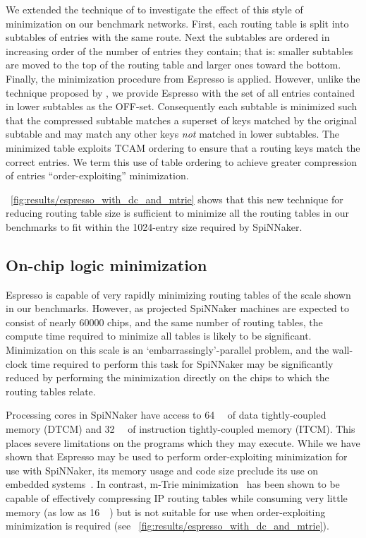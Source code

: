 \documentclass[conference]{IEEEtran}
\begin{document}
We extended the technique of \textcite{Liu2002} to investigate the effect of this style of minimization on our benchmark networks.
First, each routing table is split into subtables of entries with the same route.
Next the subtables are ordered in increasing order of the number of entries they contain; that is: smaller subtables are moved to the top of the routing table and larger ones toward the bottom.
Finally, the minimization procedure from Espresso is applied.
However, unlike the technique proposed by \textcite{Liu2002}, we provide Espresso with the set of all entries contained in lower subtables as the OFF-set.
Consequently each subtable is minimized such that the compressed subtable matches a superset of keys matched by the original subtable and may match any other keys \textit{not} matched in lower subtables.
The minimized table exploits TCAM ordering to ensure that a routing keys match the correct entries.
We term this use of table ordering to achieve greater compression of entries ``order-exploiting'' minimization.

\figurename~\ref{fig:results/espresso_with_dc_and_mtrie} shows that this new technique for reducing routing table size is sufficient to minimize all the routing tables in our benchmarks to fit within the 1024-entry size required by SpiNNaker.

\subsection*{On-chip logic minimization}

Espresso is capable of very rapidly minimizing routing tables of the scale shown in our benchmarks.
However, as projected SpiNNaker machines are expected to consist of nearly \num{60000} chips, and the same number of routing tables, the  compute time required to minimize all tables is likely to be significant.
Minimization on this scale is an `embarrassingly'-parallel problem, and the wall-clock time required to perform this task for SpiNNaker may be significantly reduced by performing the minimization directly on the chips to which the routing tables relate.

Processing cores in SpiNNaker have access to \SI{64}{\kibi\byte} of data tightly-coupled memory (DTCM) and \SI{32}{\kibi\byte} of instruction tightly-coupled memory (ITCM).
This places severe limitations on the programs which they may execute.
While we have shown that Espresso may be used to perform order-exploiting minimization for use with SpiNNaker, its memory usage and code size preclude its use on embedded systems~\parencite{Lysecky2003}.
In contrast, m-Trie minimization~\parencite{Ahmad2007} has been shown to be capable of effectively compressing IP routing tables while consuming very little memory (as low as \SI{16}{\kibi\byte}) but is not suitable for use when order-exploiting minimization is required (see \figurename~\ref{fig:results/espresso_with_dc_and_mtrie}).
\end{document}
